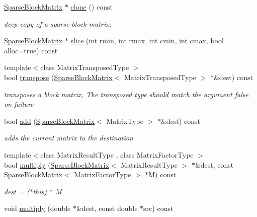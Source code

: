 \begin{DoxyCompactItemize}
\mbox{\hyperlink{classg2o_1_1_sparse_block_matrix}{Sparse\+Block\+Matrix}} $\ast$ \mbox{\hyperlink{classg2o_1_1_sparse_block_matrix_aacf3c757056cfb81e510e3005a07278e}{clone}} () const
\begin{DoxyCompactList}\small\item\em deep copy of a sparse-\/block-\/matrix; \end{DoxyCompactList}\item 
\mbox{\hyperlink{classg2o_1_1_sparse_block_matrix}{Sparse\+Block\+Matrix}} $\ast$ \mbox{\hyperlink{classg2o_1_1_sparse_block_matrix_a7ccb3f90afe0d190fbc94df5f0313763}{slice}} (int rmin, int rmax, int cmin, int cmax, bool alloc=true) const
\item 
{\footnotesize template$<$class Matrix\+Transposed\+Type $>$ }\\bool \mbox{\hyperlink{classg2o_1_1_sparse_block_matrix_a2d449bb4054991867a9b50b6c0d978eb}{transpose}} (\mbox{\hyperlink{classg2o_1_1_sparse_block_matrix}{Sparse\+Block\+Matrix}}$<$ Matrix\+Transposed\+Type $>$ $\ast$\&dest) const
\begin{DoxyCompactList}\small\item\em transposes a block matrix, The transposed type should match the argument false on failure \end{DoxyCompactList}\item 
bool \mbox{\hyperlink{classg2o_1_1_sparse_block_matrix_ae873eb42e1b3fbbe44d3cee48959c09a}{add}} (\mbox{\hyperlink{classg2o_1_1_sparse_block_matrix}{Sparse\+Block\+Matrix}}$<$ Matrix\+Type $>$ $\ast$\&dest) const
\begin{DoxyCompactList}\small\item\em adds the current matrix to the destination \end{DoxyCompactList}\item 
{\footnotesize template$<$class Matrix\+Result\+Type , class Matrix\+Factor\+Type $>$ }\\bool \mbox{\hyperlink{classg2o_1_1_sparse_block_matrix_abd1aa3a3ed3278b82945151b02223e1c}{multiply}} (\mbox{\hyperlink{classg2o_1_1_sparse_block_matrix}{Sparse\+Block\+Matrix}}$<$ Matrix\+Result\+Type $>$ $\ast$\&dest, const \mbox{\hyperlink{classg2o_1_1_sparse_block_matrix}{Sparse\+Block\+Matrix}}$<$ Matrix\+Factor\+Type $>$ $\ast$M) const
\begin{DoxyCompactList}\small\item\em dest = ($\ast$this) $\ast$ M \end{DoxyCompactList}\item 
void \mbox{\hyperlink{classg2o_1_1_sparse_block_matrix_ae71075d1c8e421389316712d12ba1598}{multiply}} (double $\ast$\&dest, const double $\ast$src) const

\end{DoxyCompactItemize}
